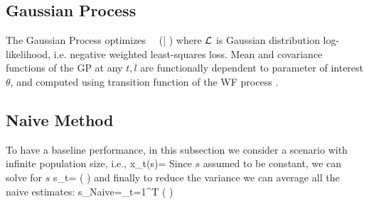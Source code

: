 \subsection{Gaussian Process}
The Gaussian Process optimizes
\beq
\underset{\theta}{ \arg \max} \ \ \Lc(\bfX | \theta)
\eeq
where ${\cal L}$ is Gaussian distribution log-likelihood, i.e. negative weighted least-squares loss. Mean and covariance functions of the GP at any $t,l$ are functionally dependent to parameter of interest $\theta$, and computed using transition function of the WF process \cite{EandR-GP}.

\subsection{Naive Method}
To have a baseline performance,  in this subsection we consider a scenario with infinite population size, i.e., 
\beq
x_t(s)=
\eeq
Since $s$ assumed to be constant, we can solve for $s$
\beq
s_t= \log \left(  \right)
\eeq
and finally to reduce the variance we can average all the naive estimates:
\beq
s_{Naive}=\sum_{t=1}^T \log \left(  \right)
\eeq
